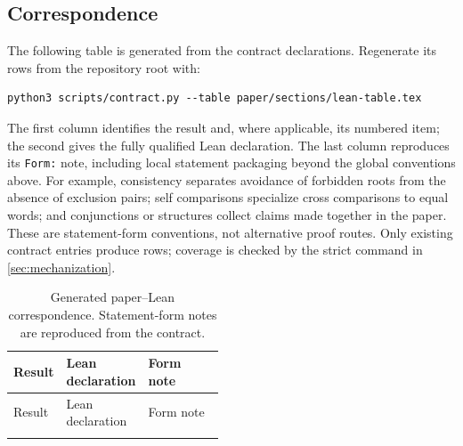 \subsection{Correspondence}
\label{app:lean-map}

The following table is generated from the contract declarations. Regenerate
its rows from the repository root with:
\begin{lstlisting}
python3 scripts/contract.py --table paper/sections/lean-table.tex
\end{lstlisting}
The first column identifies the result and, where applicable, its numbered
item; the second gives the fully qualified Lean declaration. The last column
reproduces its \texttt{Form:} note, including local statement packaging beyond
the global conventions above. For example, consistency separates avoidance
of forbidden roots from the absence of exclusion pairs; self comparisons
specialize cross comparisons to equal words; and conjunctions or structures
collect claims made together in the paper. These are statement-form
conventions, not alternative proof routes. Only existing contract entries
produce rows; coverage is checked by the strict command in
\cref{sec:mechanization}.

{\small
\setlength{\tabcolsep}{4pt}
\setlength{\emergencystretch}{2em}
\begin{longtable}{@{}>{\raggedright\arraybackslash}p{0.17\linewidth}>{\raggedright\arraybackslash}p{0.30\linewidth}>{\raggedright\arraybackslash}p{}@{}}
\caption{Generated paper--Lean correspondence. Statement-form notes are
reproduced from the contract.}\label{tab:lean}\\
\toprule
Result & Lean declaration & Form note\\
\midrule\endfirsthead
\toprule
Result & Lean declaration & Form note\\
\midrule\endhead
\bottomrule\endfoot

\end{longtable}
}
